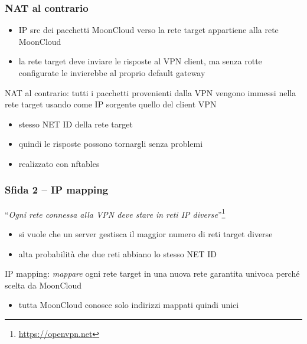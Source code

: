 \begin{frame}
	\frametitle{NAT al contrario}
	
	\begin{itemize}
		\item IP src dei pacchetti MoonCloud verso la rete target
		      appartiene alla rete MoonCloud
		\item la rete target deve inviare le risposte al VPN client, ma senza
		      rotte configurate le invierebbe al proprio default gateway
	\end{itemize}
	
	\alert{NAT al contrario}: tutti i pacchetti provenienti dalla VPN vengono
	immessi nella rete target usando come IP sorgente quello del client VPN
	\begin{itemize}
		\item stesso NET ID della rete target
		\item quindi le risposte possono tornargli senza problemi
		\item realizzato con \alert{nftables}
	\end{itemize}
\end{frame}

\begin{frame}
	\frametitle{Sfida 2 -- IP mapping}
	``\textit{Ogni rete connessa alla VPN deve stare in reti IP diverse}''\footnote{\url{https://openvpn.net}}
	\begin{itemize}
		\item si vuole che un server gestisca il maggior numero di reti target diverse
		\item alta probabilità che due reti abbiano lo stesso NET ID
	\end{itemize}
	
	\alert{IP mapping}: \textit{mappare} ogni rete target in una nuova rete
	\alert{garantita univoca} perché scelta da MoonCloud
	\begin{itemize}
		\item tutta MoonCloud conosce solo indirizzi mappati quindi unici
	\end{itemize}
\end{frame}

